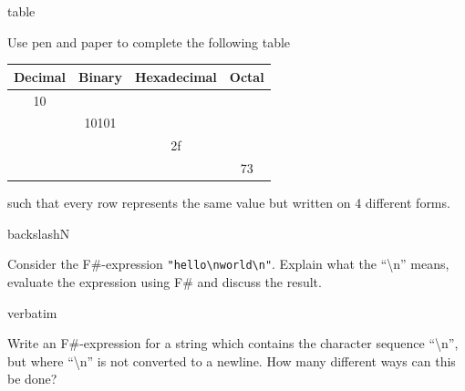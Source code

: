 \begin{defproblem}{table}
  \begin{onlyproblem}%
    Use pen and paper to complete the following table
    \begin{center}
      \begin{tabular}{|c|c|c|c|}
        \hline
        Decimal & Binary & Hexadecimal & Octal\\
        \hline
        10 &  &  & \\
        \hline
                & 10101 &  & \\
        \hline
                &  & 2f  & \\
        \hline
                &  &  & 73 \\
        \hline
      \end{tabular}
    \end{center}
    such that every row represents the same value but written on 4 different forms.
  \end{onlyproblem}
\end{defproblem}

\begin{defproblem}{backslashN}
  \begin{onlyproblem}[fragile]%
    Consider the F\#-expression \lstinline{"hello\nworld\n"}. Explain what the ``\textbackslash n'' means, evaluate the expression using F\# and discuss the result.
  \end{onlyproblem}
\end{defproblem}

\begin{defproblem}{verbatim}
  \begin{onlyproblem}[fragile]%
    Write an F\#-expression for a string which contains the character sequence ``\textbackslash n'', but where ``\textbackslash n'' is not converted to a newline. How many different ways can this be done?
  \end{onlyproblem}
\end{defproblem}
